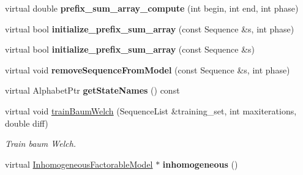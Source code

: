 \begin{DoxyCompactItemize}
\item 
\mbox{\label{classtops_1_1ProbabilisticModel_a6945f65205f92053f933a86fbd30c2d8}} 
virtual double {\bfseries prefix\+\_\+sum\+\_\+array\+\_\+compute} (int begin, int end, int phase)
\item 
\mbox{\label{classtops_1_1ProbabilisticModel_a894714015cec786d0a7817f99c432900}} 
virtual bool {\bfseries initialize\+\_\+prefix\+\_\+sum\+\_\+array} (const Sequence \&s, int phase)
\item 
\mbox{\label{classtops_1_1ProbabilisticModel_a820b813147ba615ab21da019bcb4af26}} 
virtual bool {\bfseries initialize\+\_\+prefix\+\_\+sum\+\_\+array} (const Sequence \&s)
\item 
\mbox{\label{classtops_1_1ProbabilisticModel_a99f53996f6a6e0d61836c4d472b5eeb3}} 
virtual void {\bfseries remove\+Sequence\+From\+Model} (const Sequence \&s, int phase)
\item 
\mbox{\label{classtops_1_1ProbabilisticModel_ada4951dff102aff33cfb5cedbc931651}} 
virtual Alphabet\+Ptr {\bfseries get\+State\+Names} () const
\item 
\mbox{\label{classtops_1_1ProbabilisticModel_a0145495e3e76e2969bcf7501a677afa9}} 
virtual void \hyperlink{classtops_1_1ProbabilisticModel_a0145495e3e76e2969bcf7501a677afa9}{train\+Baum\+Welch} (Sequence\+List \&training\+\_\+set, int maxiterations, double diff)
\begin{DoxyCompactList}\small\item\em Train baum Welch. \end{DoxyCompactList}\item 
\mbox{\label{classtops_1_1ProbabilisticModel_ad9e4a254a3ea39acaf8ec0481d567a08}} 
virtual \hyperlink{classtops_1_1InhomogeneousFactorableModel}{Inhomogeneous\+Factorable\+Model} $\ast$ {\bfseries inhomogeneous} ()
\item 
\mbox{\label{classtops_1_1ProbabilisticModel_a1ec53df016e5590321bbd050b068a87f}} 

\end{DoxyCompactItemize}
